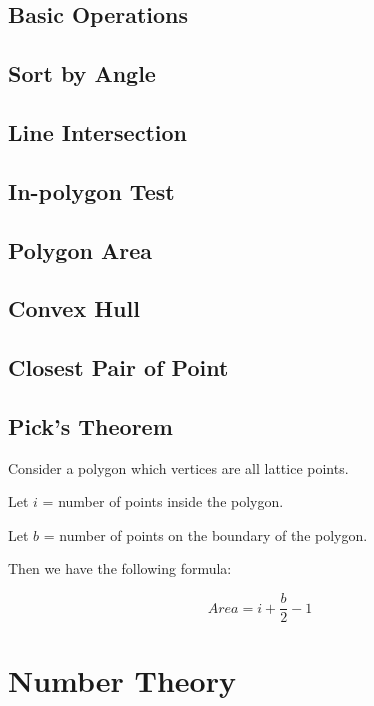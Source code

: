 \documentclass[twocolumn]{article}
\begin{document}
\subsection{Basic Operations}


\subsection{Sort by Angle}


\subsection{Line Intersection}


\subsection{In-polygon Test}


\subsection{Polygon Area}


\subsection{Convex Hull}


\subsection{Closest Pair of Point}


\subsection{Pick's Theorem}

Consider a polygon which vertices are all lattice points.

Let $i$ = number of points inside the polygon.

Let $b$ = number of points on the boundary of the polygon.

Then we have the following formula:

$$
Area = i + \frac{b}{2} - 1
$$

\section{Number Theory}
\end{document}
